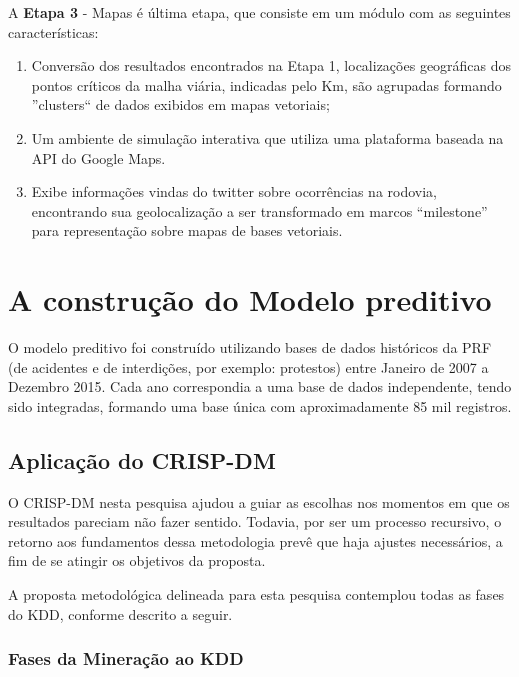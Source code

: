 A \textbf{Etapa 3} - Mapas é última etapa, que consiste em um módulo com as seguintes características:
  \begin{enumerate}
    \item Conversão dos resultados encontrados na Etapa 1, localizações geográficas dos pontos críticos da malha viária, indicadas pelo Km, são agrupadas formando ''clusters`` de dados exibidos em mapas vetoriais;
    
    \item Um ambiente de simulação interativa que utiliza uma plataforma baseada na API do Google Maps.
    
    \item Exibe informações vindas do twitter sobre ocorrências na rodovia, encontrando sua geolocalização a ser transformado em marcos ``milestone'' para representação sobre mapas de bases vetoriais.
  \end{enumerate}
 
\pagebreak 

\section{A construção do Modelo preditivo}

O modelo preditivo foi construído utilizando bases de dados históricos da PRF (de acidentes e de interdições, por exemplo: protestos) entre Janeiro de 2007 a Dezembro 2015. Cada ano correspondia a uma base de dados independente, tendo sido integradas, formando uma base única com aproximadamente 85 mil registros. 


\subsection{Aplicação do CRISP-DM}
O CRISP-DM nesta pesquisa ajudou a guiar as escolhas nos momentos em que os resultados pareciam não fazer sentido. Todavia, por ser um processo recursivo, o retorno aos fundamentos dessa metodologia prevê que haja ajustes necessários, a fim de se atingir os objetivos da proposta.

A proposta metodológica delineada para esta pesquisa contemplou todas as fases do KDD, conforme descrito a seguir.

\vspace{5mm}

\subsubsection{Fases da Mineração ao KDD}

